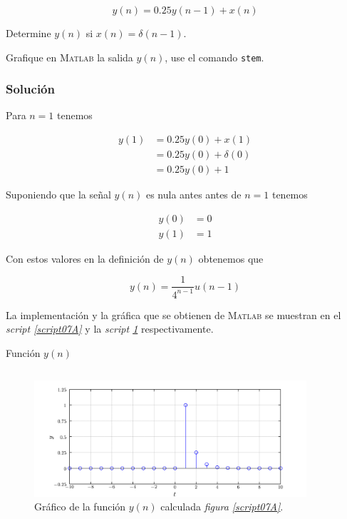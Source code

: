 \documentclass[a4paper,12pt,final]{article}
\begin{document}
    $$y\left(n\right) = 0.25 y\left(n-1\right) + x\left(n\right)$$

    Determine $y\left(n\right)$ si $x\left(n\right) = \delta\left(n-1\right)$.

    Grafique en \textsc{Matlab} la salida $y\left(n\right)$, use el comando \texttt{stem}.

    \subsubsection*{Solución}
      \noindent Para $n = 1$ tenemos

      \begin{equation*}
        \begin{split}
          y\left(1\right) & = 0.25 y\left(0\right) + x\left(1\right) \\
                          & = 0.25 y\left(0\right) + \delta\left(0\right) \\
                          & = 0.25 y\left(0\right) + 1
        \end{split}
      \end{equation*}

      \noindent Suponiendo que la señal $y\left(n\right)$ es nula antes antes de
      $n=1$ tenemos

      \begin{equation*}
        \begin{split}
          y\left(0\right) & = 0 \\
          y\left(1\right) & = 1
        \end{split}
      \end{equation*}

      \noindent Con estos valores en la definición de $y\left(n\right)$ obtenemos que

      $$y\left(n\right) = \frac{1}{4^{n-1}}u\left(n-1\right)$$

      \noindent La implementación y la gráfica que se obtienen de \textsc{Matlab}
      se muestran en el \emph{script  \ref{script07A}} y la
      \emph{script \ref{script07Afigure}} respectivamente.

      \begin{listing}[H]
        \caption{Función $y\left(n\right)$}
        \label{script07A}
        \inputminted{matlab}{./laboratorio_3/p7_Y.m}
      \end{listing}

      \begin{figure}[H]
        \caption{Gráfico de la función $y\left(n\right)$ calculada \emph{figura \ref{script07A}}.}
        \label{script07Afigure}
        \includegraphics[width=0.90\textwidth]{./laboratorio_3/problema07_Y.png}
      \end{figure}
\end{document}
